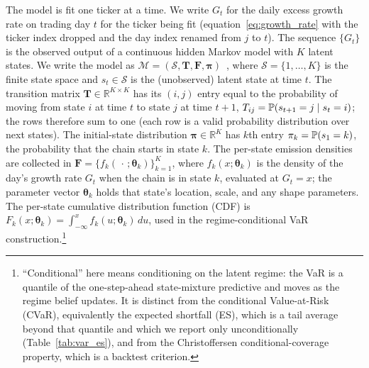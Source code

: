 The model is fit one ticker at a time. We write $G_t$ for the daily excess growth rate on trading day $t$ for the ticker being fit (equation~\eqref{eq:growth_rate} with the ticker index dropped and the day index renamed from $j$ to $t$). The sequence $\{G_t\}$ is the observed output of a continuous hidden Markov model with $K$ latent states. We write the model as $\mathcal{M} = (\mathcal{S}, \mathbf{T}, \mathbf{F}, \boldsymbol{\pi})$~\cite{rabiner1986introduction}, where $\mathcal{S} = \{1, \ldots, K\}$ is the finite state space and $s_t \in \mathcal{S}$ is the (unobserved) latent state at time $t$. The transition matrix $\mathbf{T} \in \mathbb{R}^{K \times K}$ has its $(i,j)$ entry equal to the probability of moving from state $i$ at time $t$ to state $j$ at time $t+1$, $T_{ij} = \mathbb{P}(s_{t+1} = j \mid s_t = i)$; the rows therefore sum to one (each row is a valid probability distribution over next states). The initial-state distribution $\boldsymbol{\pi} \in \mathbb{R}^K$ has $k$th entry $\pi_k = \mathbb{P}(s_1 = k)$, the probability that the chain starts in state $k$. The per-state emission densities are collected in $\mathbf{F} = \{f_k(\,\cdot\,;\boldsymbol\theta_k)\}_{k=1}^K$, where $f_k(x; \boldsymbol\theta_k)$ is the density of the day's growth rate $G_t$ when the chain is in state $k$, evaluated at $G_t = x$; the parameter vector $\boldsymbol\theta_k$ holds that state's location, scale, and any shape parameters. The per-state cumulative distribution function (CDF) is $F_k(x; \boldsymbol\theta_k) = \int_{-\infty}^x f_k(u; \boldsymbol\theta_k)\,du$, used in the regime-conditional VaR construction.\footnote{``Conditional'' here means conditioning on the latent regime: the VaR is a quantile of the one-step-ahead state-mixture predictive and moves as the regime belief updates. It is distinct from the conditional Value-at-Risk (CVaR), equivalently the expected shortfall (ES), which is a tail average beyond that quantile and which we report only unconditionally (Table~\ref{tab:var_es}), and from the Christoffersen conditional-coverage property, which is a backtest criterion.}

